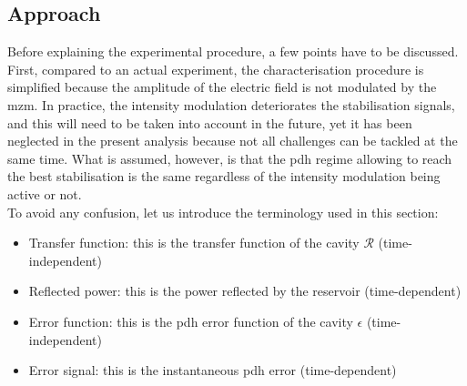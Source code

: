 
\subsection{Approach}

\label{subsec-approach}

Before explaining the experimental procedure, a few points have to be discussed. First, compared to an actual \rcer experiment, the characterisation procedure is simplified because the amplitude of the electric field is not modulated by the \gls{mzm}. In practice, the intensity modulation deteriorates the stabilisation signals, and this will need to be taken into account in the future, yet it has been neglected in the present analysis because not all challenges can be tackled at the same time. What is assumed, however, is that the \gls{pdh} regime allowing to reach the best stabilisation is the same regardless of the intensity modulation being active or not.\\

To avoid any confusion, let us introduce the terminology used in this section:

\begin{itemize}
	\item Transfer function: this is the transfer function of the cavity $\mathcal{R}$ (time-independent)
	\item Reflected power: this is the power reflected by the reservoir (time-dependent)
	\item Error function: this is the \gls{pdh} error function of the cavity $\epsilon$ (time-independent)
	\item Error signal: this is the instantaneous \gls{pdh} error (time-dependent)
\end{itemize}

